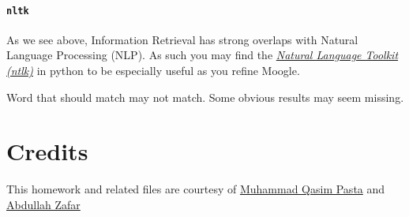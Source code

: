 \documentclass[addpoints]{exam}
\begin{document}
\paragraph{\texttt{nltk}} As we see above, Information Retrieval has strong overlaps with Natural Language Processing (NLP). As such you may find the \href{https://www.nltk.org}{\textit{Natural Language Toolkit (ntlk)}} in python to be especially useful as you refine Moogle.



Word that should match may not match.  Some obvious results may seem missing. 

\section*{Credits}

This homework and related files are courtesy of \href{http://qasimpasta.info}{Muhammad Qasim Pasta} and \href{https://www.facebook.com/abdullah.zafar.547389}{Abdullah Zafar}
\end{document}
